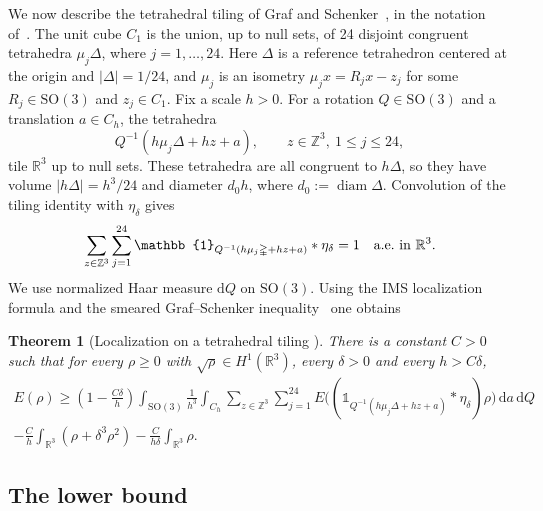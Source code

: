 \documentclass[final,reqno]{amsart}
\newtheorem{theorem}{Theorem}[section]
\theoremstyle{remark}
\theoremstyle{definition}
\renewcommand{\le}{\leqslant}
\renewcommand{\ge}{\geqslant}
\newcommand{\RR}{\mathbb{R}}
\newcommand{\ZZ}{\mathbb{Z}}
\newcommand{\iden}{\mathbb{1}}
\newcommand{\tetra}{\mathbb{\Delta}}
\begin{document}
We now describe the tetrahedral tiling of Graf and Schenker~\cite{graf1995molecular}, in the notation of~\cite[Sec.~4.2]{lewin2020local}. The unit cube $C_1$ is the union, up to null sets, of 24 disjoint congruent tetrahedra $\mu_j\tetra$, where $j=1,\ldots,24$. Here $\tetra$ is a reference tetrahedron centered at the origin and $|\tetra|=1/24$, and $\mu_j$ is an isometry $\mu_jx=R_jx-z_j$ for some $R_j\in\mathrm{SO}(3)$ and $z_j\in C_1$. Fix a scale $h>0$. For a rotation $Q\in\mathrm{SO}(3)$ and a translation $a\in C_h$, the tetrahedra
\[
Q^{-1}(h\mu_j\tetra+h z+a),
\qquad
z\in\ZZ^3,\ 1\le j\le24,
\]
tile $\RR^3$ up to null sets. These tetrahedra are all congruent to $h\tetra$, so they have volume $|h\tetra|=h^3/24$ and diameter $d_0h$, where $d_0:=\operatorname{diam}\tetra$. Convolution of the tiling identity with $\eta_\delta$ gives
\begin{equation}\label{eq:basic_partition}
\sum_{z\in\ZZ^3}\sum_{j=1}^{24}\iden_{Q^{-1}(h\mu_j\tetra+h z+a)}*\eta_\delta=1
\quad\hbox{a.e.\ in }\RR^3.
\end{equation}
We use normalized Haar measure $\mathrm dQ$ on $\mathrm{SO}(3)$. Using the IMS localization formula and the smeared Graf--Schenker inequality~\cite[Lemma~6]{graf1995molecular} one obtains
\begin{theorem}[Localization on a tetrahedral tiling {\cite[Prop.~16]{lewin2020local}}]\label{thm:basic_localization}
There is a constant $C>0$ such that for every $\rho\ge0$ with $\sqrt\rho\in H^1(\RR^3)$, every $\delta>0$ and every $h>C\delta$,
\begin{multline}\label{eq:basic_localization}
E(\rho)\ge
\left(1-\frac{C\delta}h\right)
\int_{\mathrm{SO}(3)}\frac1{h^3}\int_{C_h}
\sum_{z\in\ZZ^3}\sum_{j=1}^{24}
E\big((\iden_{Q^{-1}(h\mu_j\tetra+h z+a)}*\eta_\delta)\rho\big)
\,\mathrm da\,\mathrm dQ
\\
-\frac{C}{h}\int_{\RR^3}(\rho+\delta^3\rho^2)
-\frac{C}{h\delta}\int_{\RR^3}\rho.
\end{multline}
\end{theorem}


\subsection{The lower bound}\label{sec:lower}
\end{document}
